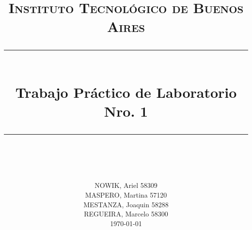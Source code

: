 


\usepackage{listings}
\newcommand{\horrule}[1]{\rule{\linewidth}{#1}}

\title{
        \normalfont \normalsize \textsc{Instituto Tecnológico de Buenos Aires} \\ [25pt]
        \horrule{0.5pt} \\[0.4cm]
        \huge Trabajo Práctico de Laboratorio Nro. 1 \\
        \horrule{2pt} \\[0.5cm]
}
\author{
        \normalfont 								\normalsize
        NOWIK, Ariel 58309\\[-3pt]		\normalsize
        MASPERO, Martina 57120\\[-3pt]		\normalsize
        MESTANZA, Joaquin 58288\\[-3pt]		\normalsize
        REGUEIRA, Marcelo 58300\\[-3pt]		\normalsize
        \today
}
\date{}




\maketitle








